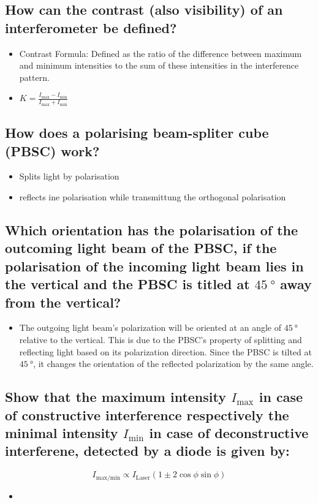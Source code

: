 \subsection*{How can the contrast (also visibility) of an interferometer be defined?}
\begin{itemize}
    \item Contrast Formula: Defined as the ratio of the difference between maximum and minimum intensities to the sum of these intensities in the interference pattern.
    \item $K=\frac{I_\text{max}-I_\text{min}}{I_\text{max}+I_\text{min}}$
\end{itemize}

\subsection*{How does a polarising beam-spliter cube (PBSC) work?}
\begin{itemize}
    \item Splits light by polarisation
    \item reflects ine polarisation while transmittung the orthogonal polarisation
\end{itemize}
\subsection*{Which orientation has the polarisation of the outcoming light beam of the PBSC, if the polarisation of the incoming light beam lies in the vertical and the PBSC is titled at $\SI{45}{\degree}$ away from the vertical?}
\begin{itemize}
    \item The outgoing light beam's polarization will be oriented at an angle of $\SI{45}{\degree}$ relative to the vertical. This is due to the PBSC's property of splitting and reflecting light based on its polarization direction. Since the PBSC is tilted at $\SI{45}{\degree}$, it changes the orientation of the reflected polarization by the same angle.
\end{itemize}

\subsection*{Show that the maximum intensity $I_\text{max}$ in case of constructive interference respectively the minimal intensity $I_\text{min}$ in case of deconstructive interferene, detected by a diode is given by:}
\begin{equation*}
    I_\text{max/min}\propto I_\text{Laser}(1\pm2\cos\phi\sin\phi)
\end{equation*}
\begin{itemize}
    \item 
\end{itemize}
